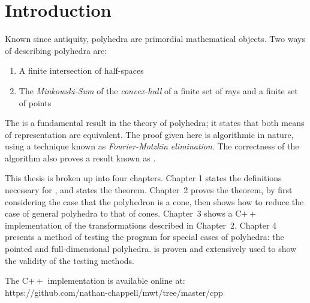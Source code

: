 \chapter*{Introduction}

Known since antiquity, polyhedra are primordial mathematical objects.  Two ways of describing polyhedra are:
\begin{enumerate}
  \item A finite intersection of half-spaces
  \item The \textit{Minkowski-Sum} of the \textit{convex-hull} of a finite set of rays and a finite set of points
\end{enumerate}
The {\MWT} is a fundamental result in the theory of polyhedra; it states that both means of representation are equivalent.  The proof given here is algorithmic in nature, using a technique known as \textit{Fourier-Motzkin elimination}.  The correctness of the algorithm also proves a result known as .

This thesis is broken up into four chapters.  Chapter 1 states the definitions necessary for {\MWT}, and states the theorem.  Chapter~2 proves the theorem, by first considering the case that the polyhedron is a cone, then shows how to reduce the case of general polyhedra to that of cones.  Chapter~3 shows a C$++$ implementation of the transformations described in Chapter~2.  Chapter 4 presents a method of testing the program for special cases of polyhedra: the pointed and full-dimensional polyhedra.   is proven and extensively used to show the validity of the testing methods.

The C$++$ implementation is available online at:\\
https://github.com/nathan-chappell/mwt/tree/master/cpp
